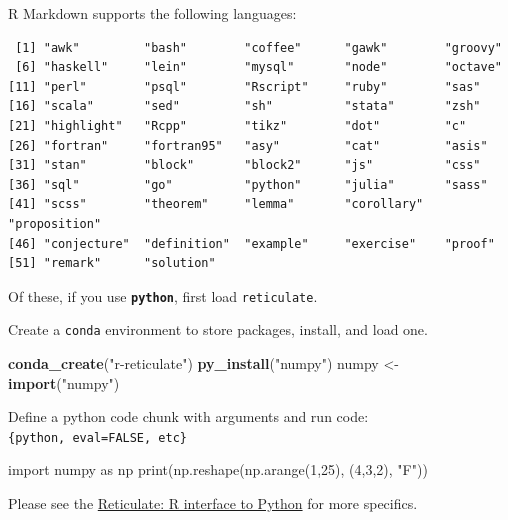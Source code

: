 \documentclass[12pt,oneside]{chicagocapstone}
\newenvironment{Shaded}{\begin{snugshade}}{\end{snugshade}}
\newcommand{\BuiltInTok}[1]{#1}
\newcommand{\DecValTok}[1]{\textcolor[rgb]{0.00,0.00,0.81}{#1}}
\newcommand{\ImportTok}[1]{#1}
\newcommand{\KeywordTok}[1]{\textcolor[rgb]{0.13,0.29,0.53}{\textbf{#1}}}
\newcommand{\NormalTok}[1]{#1}
\newcommand{\OperatorTok}[1]{\textcolor[rgb]{0.81,0.36,0.00}{\textbf{#1}}}
\newcommand{\StringTok}[1]{\textcolor[rgb]{0.31,0.60,0.02}{#1}}
\begin{document}
R Markdown supports the following languages:
\begin{Shaded}
\end{Shaded}
\begin{verbatim}
 [1] "awk"         "bash"        "coffee"      "gawk"        "groovy"     
 [6] "haskell"     "lein"        "mysql"       "node"        "octave"     
[11] "perl"        "psql"        "Rscript"     "ruby"        "sas"        
[16] "scala"       "sed"         "sh"          "stata"       "zsh"        
[21] "highlight"   "Rcpp"        "tikz"        "dot"         "c"          
[26] "fortran"     "fortran95"   "asy"         "cat"         "asis"       
[31] "stan"        "block"       "block2"      "js"          "css"        
[36] "sql"         "go"          "python"      "julia"       "sass"       
[41] "scss"        "theorem"     "lemma"       "corollary"   "proposition"
[46] "conjecture"  "definition"  "example"     "exercise"    "proof"      
[51] "remark"      "solution"   
\end{verbatim}
Of these, if you use \textbf{\texttt{python}}, first load \texttt{reticulate}.
\begin{Shaded}
\end{Shaded}
Create a \texttt{conda} environment to store packages, install, and load one.
\begin{Shaded}
\begin{Highlighting}[]
\KeywordTok{conda_create}\NormalTok{(}\StringTok{"r-reticulate"}\NormalTok{)}
\KeywordTok{py_install}\NormalTok{(}\StringTok{"numpy"}\NormalTok{)}
\NormalTok{numpy <-}\StringTok{ }\KeywordTok{import}\NormalTok{(}\StringTok{"numpy"}\NormalTok{)}
\end{Highlighting}
\end{Shaded}
Define a python code chunk with arguments and run code: \texttt{\{python,\ eval=FALSE,\ etc\}}
\begin{Shaded}
\begin{Highlighting}[]
\ImportTok{import}\NormalTok{ numpy }\ImportTok{as}\NormalTok{ np}
\BuiltInTok{print}\NormalTok{(np.reshape(np.arange(}\DecValTok{1}\NormalTok{,}\DecValTok{25}\NormalTok{), (}\DecValTok{4}\NormalTok{,}\DecValTok{3}\NormalTok{,}\DecValTok{2}\NormalTok{), }\StringTok{"F"}\NormalTok{))}
\end{Highlighting}
\end{Shaded}
Please see the \href{https://rstudio.github.io/reticulate/}{Reticulate: R interface to Python} for more specifics.
\end{document}
